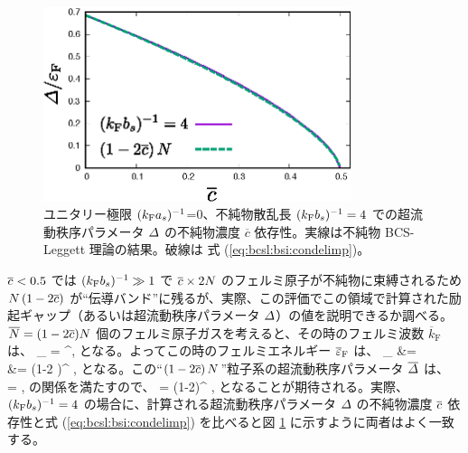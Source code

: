 \begin{figure}[t]
\centering
\includegraphics[width=90mm]{eps/bcsl-small-c.eps}
\caption{ユニタリー極限 $(k_{\text{F}} a_s)^{-1}$=0、不純物散乱長 $(k_{\text{F}} b_s)^{-1}=4$ での超流動秩序パラメータ $\varDelta$ の不純物濃度 $\overline{c}$ 依存性。実線は不純物 BCS-Leggett 理論の結果。破線は 式 (\ref{eq:bcsl:bsi:condelimp})。}
\label{fig:bcsl:imp:bcsl-ias000-condep}
\end{figure}


$\overline{c} < 0.5$ では $(k_{\text{F}} b_s)^{-1} \gg 1$ で $\overline{c} \times 2 N$ のフェルミ原子が不純物に束縛されるため $N\left(1-2\overline{c}\right)$ が“伝導バンド”に残るが、実際、この評価でこの領域で計算された励起ギャップ（あるいは超流動秩序パラメータ $\varDelta$）の値を説明できるか調べる。$\overline{N}=(1-2\overline{c})N$ 個のフェルミ原子ガスを考えると、その時のフェルミ波数 $\overline{k}_{\text{F}}$ は、
\beq
{}_{} = ^{},
\eeq
となる。よってこの時のフェルミエネルギー $\overline{\varepsilon}_{\text{F}}$ は、
\beq
\overline{\ken}_{} &=   \notag\\
&= \left(1-2 \lc\right)^{} \eqf,
\eeq
となる。この“$\left(1-2 \overline{c}\right)N$”粒子系の超流動秩序パラメータ $\overline{\varDelta}$ は、
\beq
{} = \frac{\del}{\eqf},
\eeq
の関係を満たすので、
\beq
\overline{\del} = \left(1-2\lc\right)^{} \del, \label{eq:bcsl:bsi:condelimp}
\eeq
となることが期待される。実際、$(k_{\text{F}} b_s)^{-1}=4$ の場合に、計算される超流動秩序パラメータ $\varDelta$ の不純物濃度 $\overline{c}$ 依存性と式 (\ref{eq:bcsl:bsi:condelimp}) を比べると図 \ref{fig:bcsl:imp:bcsl-ias000-condep} に示すように両者はよく一致する。



